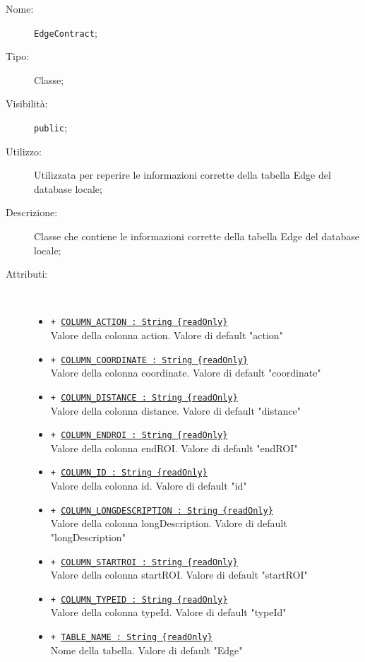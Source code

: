 \documentclass[../DefinizioneDiProdotto.tex]{subfiles}
\begin{document}
\begin{description}
	\item[Nome:] \texttt{EdgeContract};
	\item[Tipo:] Classe;
	\item[Visibilità:] \texttt{public};
	\item[Utilizzo:] Utilizzata per reperire le informazioni corrette della tabella Edge del database locale;
	\item[Descrizione:] Classe che contiene le informazioni corrette della tabella Edge del database locale;
	\item[Attributi:] \
	\begin{itemize}
		\item \texttt{+ \underline{COLUMN\_ACTION : String \{readOnly\}}}\\
		Valore della colonna action. Valore di default "action"
		
		\item \texttt{+ \underline{COLUMN\_COORDINATE : String \{readOnly\}}}\\
		Valore della colonna coordinate. Valore di default "coordinate"
		
		\item \texttt{+ \underline{COLUMN\_DISTANCE : String \{readOnly\}}}\\
		Valore della colonna distance. Valore di default "distance"
		
		\item \texttt{+ \underline{COLUMN\_ENDROI : String \{readOnly\}}}\\
		Valore della colonna endROI. Valore di default "endROI"
		
		\item \texttt{+ \underline{COLUMN\_ID : String \{readOnly\}}}\\
		Valore della colonna id. Valore di default "id"
		
		\item \texttt{+ \underline{COLUMN\_LONGDESCRIPTION : String \{readOnly\}}}\\
		Valore della colonna longDescription. Valore di default "longDescription"
		
		\item \texttt{+ \underline{COLUMN\_STARTROI : String \{readOnly\}}}\\
		Valore della colonna startROI. Valore di default "startROI"
		
		\item \texttt{+ \underline{COLUMN\_TYPEID : String \{readOnly\}}}\\
		Valore della colonna typeId. Valore di default "typeId"
		
		\item \texttt{+ \underline{TABLE\_NAME : String \{readOnly\}}}\\
		Nome della tabella. Valore di default "Edge"
		
	\end{itemize}
\end{description}
\end{document}
